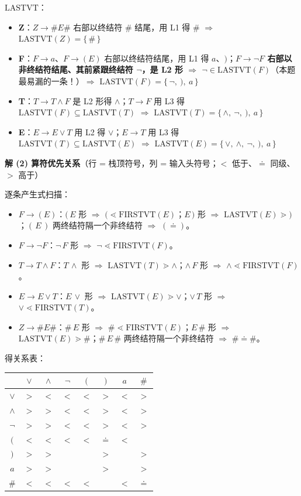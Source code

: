 \documentclass[12pt,a4paper,fontset=windows]{ctexart}
\newcommand{\FV}[1]{\ensuremath{\mathrm{FIRSTVT}(#1)}}
\newcommand{\LV}[1]{\ensuremath{\mathrm{LASTVT}(#1)}}
\newcommand{\LVname}{\ensuremath{\mathrm{LASTVT}}}
\newcommand{\imp}{\ensuremath{\Rightarrow}}
\begin{document}
\LVname{}：
\begin{itemize}
\item \textbf{Z}：$Z \to \#E\#$ 右部以终结符 $\#$ 结尾，用 L1 得 $\#$ \imp{} $\LV{Z} = \{\,\#\,\}$
\item \textbf{F}：$F \to a$、$F \to (E)$ 右部以终结符结尾，用 L1 得 $a$、$)$；\textbf{$F \to \neg F$ 右部以非终结符结尾、其前紧跟终结符 $\neg$，是 L2 形 \imp{} $\neg \in \LV{F}$}（本题最易漏的一条！）\imp{} $\LV{F} = \{\,\neg,\ ),\ a\,\}$
\item \textbf{T}：$T \to T \wedge F$ 是 L2 形得 $\wedge$；$T \to F$ 用 L3 得 $\LV{F} \subseteq \LV{T}$ \imp{} $\LV{T} = \{\,\wedge,\ \neg,\ ),\ a\,\}$
\item \textbf{E}：$E \to E \vee T$ 用 L2 得 $\vee$；$E \to T$ 用 L3 得 $\LV{T} \subseteq \LV{E}$ \imp{} $\LV{E} = \{\,\vee,\ \wedge,\ \neg,\ ),\ a\,\}$
\end{itemize}

\textbf{解 (2) 算符优先关系}（行 = 栈顶符号，列 = 输入头符号；$<$ 低于、$\doteq$ 同级、$>$ 高于）

逐条产生式扫描：
\begin{itemize}
\item \textbf{$F \to (E)$}：$(\,E$ 形 \imp{} $( \lessdot \FV{E}$；$E\,)$ 形 \imp{} $\LV{E} \gtrdot )$；$(\,E\,)$ 两终结符隔一个非终结符 \imp{} $( \doteq )$。
\item \textbf{$F \to \neg F$}：$\neg\,F$ 形 \imp{} $\neg \lessdot \FV{F}$。
\item \textbf{$T \to T \wedge F$}：$T\,\wedge$ 形 \imp{} $\LV{T} \gtrdot \wedge$；$\wedge\,F$ 形 \imp{} $\wedge \lessdot \FV{F}$。
\item \textbf{$E \to E \vee T$}：$E\,\vee$ 形 \imp{} $\LV{E} \gtrdot \vee$；$\vee\,T$ 形 \imp{} $\vee \lessdot \FV{T}$。
\item \textbf{$Z \to \#E\#$}：$\#\,E$ 形 \imp{} $\# \lessdot \FV{E}$；$E\,\#$ 形 \imp{} $\LV{E} \gtrdot \#$；$\#\,E\,\#$ 两终结符隔一个非终结符 \imp{} $\# \doteq \#$。
\end{itemize}

得关系表：

\begin{center}
\renewcommand{\arraystretch}{1.35}
\begin{tabular}{c|ccccccc}
\toprule
  & $\vee$ & $\wedge$ & $\neg$ & $($ & $)$ & $a$ & $\#$ \\
\midrule
$\vee$   & $>$ & $<$ & $<$ & $<$ & $>$ & $<$ & $>$ \\
$\wedge$ & $>$ & $>$ & $<$ & $<$ & $>$ & $<$ & $>$ \\
$\neg$   & $>$ & $>$ & $<$ & $<$ & $>$ & $<$ & $>$ \\
$($      & $<$ & $<$ & $<$ & $<$ & $\doteq$ & $<$ &   \\
$)$      & $>$ & $>$ &   &   & $>$ &   & $>$ \\
$a$      & $>$ & $>$ &   &   & $>$ &   & $>$ \\
$\#$     & $<$ & $<$ & $<$ & $<$ &   & $<$ & $\doteq$ \\
\bottomrule
\end{tabular}
\end{center}
\end{document}
